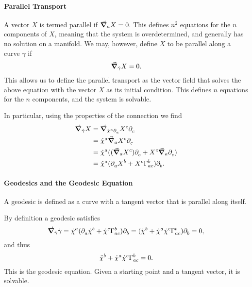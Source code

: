 \paragraph{Parallel Transport}
A vector $X$ is termed parallel if $\grad_{a}{X} = 0$. This defines $n^{2}$ equations for the $n$ components of $X$, meaning that the system is overdetermined, and generally has no solution on a manifold. We may, however, define $X$ to be parallel along a curve $\gamma$ if
\begin{align*}
	\grad_{\dot{\gamma}}{X} = 0.
\end{align*}
This allows us to define the parallel transport as the vector field that solves the above equation with the vector $X$ as its initial condition. This defines $n$ equations for the $n$ components, and the system is solvable.

In particular, using the properties of the connection we find
\begin{align*}
	\dcov{\dot{\gamma}}{X} &= \dcov{\dot{\chi}^{a}\del{a}{}}{X^{c}\del{c}{}} \\
	&= \dot{\chi}^{a}\dcov{a}{X^{c}\del{c}{}} \\
	&= \dot{\chi}^{a}((\dcov{a}{X^{c}})\del{c}{} + X^{c}\dcov{a}{\del{c}{}}) \\
	&= \dot{\chi}^{a}(\del{a}{X^{b}} + X^{c}\chris{b}{a}{c})\del{b}{}.
\end{align*}

\paragraph{Geodesics and the Geodesic Equation}
A geodesic is defined as a curve with a tangent vector that is parallel along itself.

By definition a geodesic satisfies
\begin{align*}
	\dcov{\dot{\gamma}}{\dot{\gamma}} = \dot{\chi}^{a}(\del{a}{\dot{\chi}^{b}} + \dot{\chi}^{c}\chris{b}{a}{c})\del{b}{} = (\ddot{\chi}^{b} + \dot{\chi}^{a}\dot{\chi}^{c}\chris{b}{a}{c})\del{b}{} = 0,
\end{align*}
and thus
\begin{align*}
	\ddot{\chi}^{b} + \dot{\chi}^{a}\dot{\chi}^{c}\chris{b}{a}{c} = 0.
\end{align*}
This is the geodesic equation. Given a starting point and a tangent vector, it is solvable.

